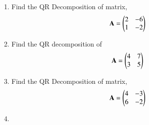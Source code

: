 \begin{enumerate}[label=\thesection.\arabic*.,ref=\thesection.\theenumi]
\solution

\item Find the QR Decomposition of matrix,
\begin{align}
\mathbf{A} = \begin{pmatrix}2&-6\\1&-2\end{pmatrix}
\label{eq:solutions/2/26/Q}
\end{align}
\item Find the QR decomposition of 
\begin{align} 
    \mathbf{A} = \begin{pmatrix}4 & 7 \\ 3 & 5\end{pmatrix}
\end{align}
%
\item Find the QR Decomposition of matrix,
\begin{align}
\mathbf{A} = \begin{pmatrix}4&-3\\6&-2\end{pmatrix}
\label{eq:solutions/2/28/Q}
\end{align}
%
\solution

%
\item
\solution

\end{enumerate}
